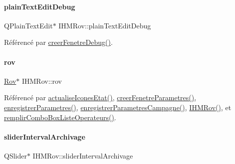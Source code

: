 \paragraph{\texorpdfstring{plain\+Text\+Edit\+Debug}{plainTextEditDebug}}
{\footnotesize\ttfamily Q\+Plain\+Text\+Edit$\ast$ I\+H\+M\+Rov\+::plain\+Text\+Edit\+Debug\hspace{0.3cm}{\ttfamily [private]}}



Référencé par \hyperlink{class_i_h_m_rov_a30b49bada719a73e0899ad4bafb4de99}{creer\+Fenetre\+Debug()}.

\mbox{\label{class_i_h_m_rov_a777ca33fdb295ba6b6773e880356fa1e}} 
\paragraph{\texorpdfstring{rov}{rov}}
{\footnotesize\ttfamily \hyperlink{class_rov}{Rov}$\ast$ I\+H\+M\+Rov\+::rov\hspace{0.3cm}{\ttfamily [private]}}



Référencé par \hyperlink{class_i_h_m_rov_abbfcdc154a6ae7f941d186f6c90a5a2b}{actualise\+Icones\+Etat()}, \hyperlink{class_i_h_m_rov_aed451139ac09ef18b7c92637761d80ce}{creer\+Fenetre\+Parametres()}, \hyperlink{class_i_h_m_rov_a94d31f4e748f3e4549eab42c8bc7e367}{enregistrer\+Parametres()}, \hyperlink{class_i_h_m_rov_a229194814bfb1fc94ab3cc86d6411921}{enregistrer\+Parametres\+Campagne()}, \hyperlink{class_i_h_m_rov_a5dac1fb4612866cc61f699a415e0ef6b}{I\+H\+M\+Rov()}, et \hyperlink{class_i_h_m_rov_a752a8dc2b3b68d536e94ff8bfb62f46f}{remplir\+Combo\+Box\+Liste\+Operateurs()}.

\mbox{\label{class_i_h_m_rov_a8c55c93ee14ee51335e72af07b521312}} 
\paragraph{\texorpdfstring{slider\+Interval\+Archivage}{sliderIntervalArchivage}}
{\footnotesize\ttfamily Q\+Slider$\ast$ I\+H\+M\+Rov\+::slider\+Interval\+Archivage\hspace{0.3cm}{\ttfamily [private]}}



